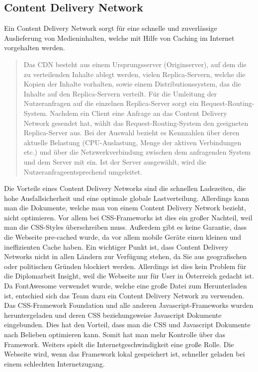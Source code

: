 \subsection{Content Delivery Network}
Ein Content Delivery Network sorgt für eine schnelle und zuverlässige Auslieferung von Medieninhalten, welche mit Hilfe von Caching im Internet vorgehalten werden. 

\begin{quote}
Das CDN besteht aus einem Ursprungsserver (Originserver), auf dem die zu verteilenden Inhalte ablegt werden, vielen Replica-Servern, welche die Kopien der Inhalte vorhalten, sowie einem Distributionssystem, das die Inhalte auf den Replica-Servern verteilt. Für die Umleitung der Nutzeranfragen auf die einzelnen Replica-Server sorgt ein Request-Routing-System. Nachdem ein Client eine Anfrage an das Content Delivery Network gesendet hat, wählt das Request-Routing-System den geeigneten Replica-Server aus. Bei der Auswahl bezieht es Kennzahlen über deren aktuelle Belastung (CPU-Auslastung, Menge der aktiven Verbindungen etc.) und über die Netzwerkverbindung zwischen dem anfragenden System und dem Server mit ein. Ist der Server ausgewählt, wird die Nutzeranfrageentsprechend umgeleitet.
\end{quote}

Die Vorteile eines Content Delivery Networks sind die schnellen Ladezeiten, die hohe Ausfallsicherheit und eine optimale globale Lastverteilung.   Allerdings kann man die Dokumente, welche man von einem Content Delivery Network bezieht, nicht optimieren. Vor allem bei CSS-Frameworks ist dies ein großer Nachteil, weil man die CSS-Styles überschreiben muss. Außerdem gibt es keine Garantie, dass die Webseite pre-cached wurde, da vor allem mobile Geräte einen kleinen und ineffizienten Cache haben. Ein wichtiger Punkt ist, dass Content Delivery Networks nicht in allen Ländern zur Verfügung stehen, da Sie aus geografischen oder politischen Gründen blockiert werden. Allerdings ist dies kein Problem für die Diplomarbeit Insight, weil die Webseite nur für User in Österreich gedacht ist.  
\\
Da FontAwesome verwendet wurde, welche eine große Datei zum Herunterladen ist, entschied sich das Team dazu ein Content Delivery Network zu verwenden. 
\\
Das CSS-Framework Foundation und alle anderen Javascript-Frameworks wurden heruntergeladen und deren CSS beziehungsweise Javascript Dokumente eingebunden. Dies hat den Vorteil, dass man die CSS und Javascript Dokumente nach Belieben optimieren kann. Somit hat man mehr Kontrolle über das Framework. Weiters spielt die Internetgeschwindigkeit eine große Rolle. Die Webseite wird, wenn das Framework lokal gespeichert ist, schneller geladen bei einem schlechten Internetzugang. 

